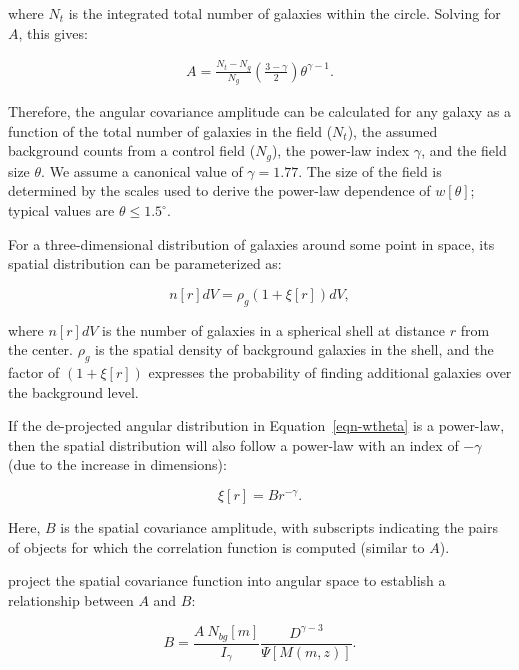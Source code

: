 \documentclass{emulateapj}
\begin{document}
\noindent where $N_t$ is the integrated total number of galaxies within the circle. Solving for $A$, this gives:

\begin{eqnarray}
A = \frac{N_t - N_g}{N_g} \left(\frac{3-\gamma}{2}\right) \theta^{\gamma-1}.
\end{eqnarray}

Therefore, the angular covariance amplitude can be calculated for any galaxy as a function of the total number of galaxies in the field ($N_t$), the assumed background counts from a control field ($N_g$), the power-law index $\gamma$, and the field size $\theta$. We assume a canonical value of $\gamma=1.77$. The size of the field is determined by the scales used to derive the power-law dependence of $w[\theta]$; typical values are $\theta\leq1.5^\circ$. 

For a three-dimensional distribution of galaxies around some point in space, its spatial distribution can be parameterized as:

\begin{equation}
n[r]dV = \rho_g (1 + \xi[r]) dV,
\end{equation}

\noindent where $n[r]dV$ is the number of galaxies in a spherical shell at distance $r$ from the center. $\rho_g$ is the spatial density of background galaxies in the shell, and the factor of $(1+\xi[r])$ expresses the probability of finding additional galaxies over the background level. 

If the de-projected angular distribution in Equation~\ref{eqn-wtheta} is a power-law, then the spatial distribution will also follow a power-law with an index of $-\gamma$ (due to the increase in dimensions):

\begin{equation}
\xi[r] = Br^{-\gamma}.
\end{equation}

\noindent Here, $B$ is the spatial covariance amplitude, with subscripts indicating the pairs of objects for which the correlation function is computed (similar to $A$). 

\citet{lon79} project the spatial covariance function into angular space to establish a relationship between $A$ and $B$: 

\begin{equation}
\label{eqn-atob}
B = \frac{A~N_{bg}[m]}{I_\gamma} \frac{D^{\gamma-3}}{\Psi[M(m,z)]}.
\end{equation}
\end{document}

